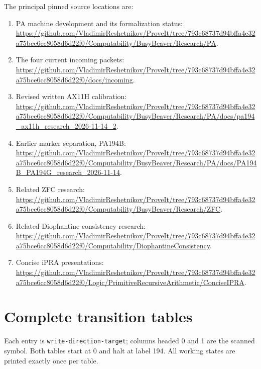 \documentclass[11pt]{article}
\begin{document}
The principal pinned source locations are:
\begin{enumerate}
\item PA machine development and its formalization status:\newline
\url{https://github.com/VladimirReshetnikov/ProveIt/tree/793c68737d94bffa4e32a75bce6cc8058d6d22f0/Computability/BusyBeaver/Research/PA}.
\item The four current incoming packets:\newline
\url{https://github.com/VladimirReshetnikov/ProveIt/tree/793c68737d94bffa4e32a75bce6cc8058d6d22f0/docs/incoming}.
\item Revised written AX11H calibration:\newline
\url{https://github.com/VladimirReshetnikov/ProveIt/tree/793c68737d94bffa4e32a75bce6cc8058d6d22f0/Computability/BusyBeaver/Research/PA/docs/pa194_ax11h_research_2026-11-14_2}.
\item Earlier marker separation, PA194B:\newline
\url{https://github.com/VladimirReshetnikov/ProveIt/tree/793c68737d94bffa4e32a75bce6cc8058d6d22f0/Computability/BusyBeaver/Research/PA/docs/PA194B_PA194G_research_2026-11-14}.
\item Related ZFC research:\newline
\url{https://github.com/VladimirReshetnikov/ProveIt/tree/793c68737d94bffa4e32a75bce6cc8058d6d22f0/Computability/BusyBeaver/Research/ZFC}.
\item Related Diophantine consistency research:\newline
\url{https://github.com/VladimirReshetnikov/ProveIt/tree/793c68737d94bffa4e32a75bce6cc8058d6d22f0/Computability/DiophantineConsistency}.
\item Concise iPRA presentations:\newline
\url{https://github.com/VladimirReshetnikov/ProveIt/tree/793c68737d94bffa4e32a75bce6cc8058d6d22f0/Logic/PrimitiveRecursiveArithmetic/ConciseIPRA}.
\end{enumerate}

\appendix
\clearpage
\section{Complete transition tables}
\label{app:tables}
Each entry is \texttt{write-direction-target}; columns headed 0 and 1
are the scanned symbol. Both tables start at 0 and halt at label 194.
All working states are printed exactly once per table.

\clearpage
\end{document}
